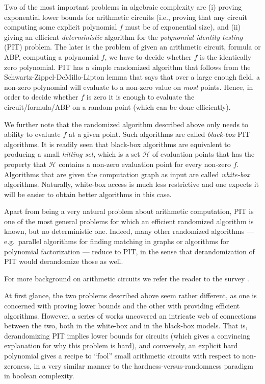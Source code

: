 \documentclass[11pt]{article}
\newcommand{\cH}{\mathcal{H}}
\begin{document}
Two of the most important problems in algebraic complexity are (i) proving exponential lower bounds for arithmetic circuits (i.e., proving that any circuit computing some explicit polynomial $f$ must be of exponential size), and (ii) giving an efficient {\em deterministic} algorithm for the {\em polynomial identity testing} (PIT) problem.  The later is the problem of given an arithmetic circuit, formula or ABP, computing a polynomial $f$, we have to decide whether $f$ is the identically zero polynomial. PIT has a simple randomized algorithm that follows from the Schwartz-Zippel-DeMillo-Lipton lemma \cite{S80, Z79, DL78} that says that over a large enough field, a non-zero polynomial will evaluate to a non-zero value on {\em most} points. Hence, in order to decide whether $f$ is zero it is enough to evaluate the circuit/formula/ABP on a random point (which can be done efficiently).

We further note that the randomized algorithm described above only needs to ability to evaluate $f$ at a given point. Such algorithms are called {\em black-box} PIT algorithms. It is readily seen that black-box algorithms are equivalent to producing a small {\em hitting set}, which is a set $\cH$ of evaluation points that has the property that $\cH$ contains a non-zero evaluation point for every non-zero $f$.
Algorithms that are given the computation graph as input are called {\em white-box} algorithms. Naturally, white-box access is much less restrictive and one expects it will be easier to obtain better algorithms in this case. 

Apart from being a very natural problem about arithmetic computation, PIT is one of the most general problems for which an efficient randomized algorithm is known, but no deterministic one. Indeed, many other randomized algorithms --- e.g.\ parallel algorithms for finding matching in graphs \cite{KUW86, MVV87} or algorithms for polynomial factorization \cite{sv-icalp10, KSS15} --- reduce to PIT, in the sense that derandomization of PIT would derandomize those as well.

For more background on arithmetic circuits we refer the reader to the survey \cite{sy}.

\medskip

At first glance, the two problems described above seem rather different, as one is concerned with proving lower bounds and the other with  providing efficient algorithms. However, a series of works uncovered an intricate web of connections between the two, both in the white-box \cite{ki03, DSY09} and in the black-box \cite{HS80, a05} models. That is, derandomizing PIT implies lower bounds for circuits (which gives a convincing explanation for why this problem is hard), and conversely, an explicit hard polynomial gives a recipe to ``fool'' small arithmetic circuits with respect to non-zeroness, in a very similar manner to the hardness-versus-randomness paradigm in boolean complexity.
\end{document}
